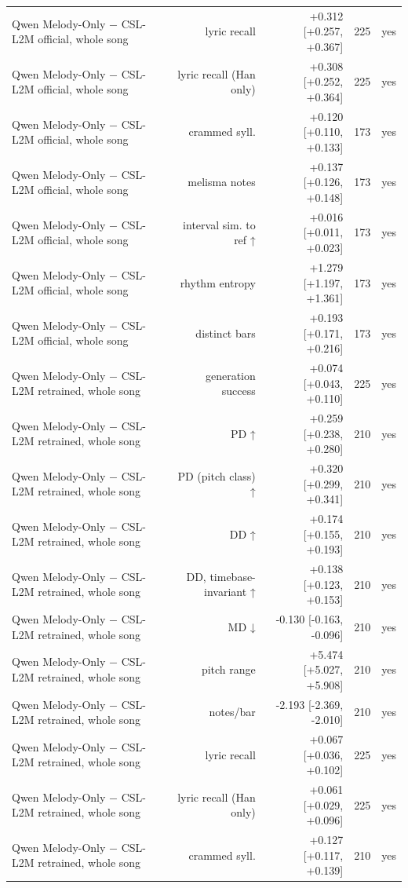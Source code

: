 \begin{table}[t]
\begin{tabular}{lrrrr}
Qwen Melody-Only $-$ CSL-L2M official, whole song & lyric recall & +0.312 [+0.257, +0.367] & 225 & yes \\
Qwen Melody-Only $-$ CSL-L2M official, whole song & lyric recall (Han only) & +0.308 [+0.252, +0.364] & 225 & yes \\
Qwen Melody-Only $-$ CSL-L2M official, whole song & crammed syll. & +0.120 [+0.110, +0.133] & 173 & yes \\
Qwen Melody-Only $-$ CSL-L2M official, whole song & melisma notes & +0.137 [+0.126, +0.148] & 173 & yes \\
Qwen Melody-Only $-$ CSL-L2M official, whole song & interval sim. to ref ↑ & +0.016 [+0.011, +0.023] & 173 & yes \\
Qwen Melody-Only $-$ CSL-L2M official, whole song & rhythm entropy & +1.279 [+1.197, +1.361] & 173 & yes \\
Qwen Melody-Only $-$ CSL-L2M official, whole song & distinct bars & +0.193 [+0.171, +0.216] & 173 & yes \\
Qwen Melody-Only $-$ CSL-L2M retrained, whole song & generation success & +0.074 [+0.043, +0.110] & 225 & yes \\
Qwen Melody-Only $-$ CSL-L2M retrained, whole song & PD ↑ & +0.259 [+0.238, +0.280] & 210 & yes \\
Qwen Melody-Only $-$ CSL-L2M retrained, whole song & PD (pitch class) ↑ & +0.320 [+0.299, +0.341] & 210 & yes \\
Qwen Melody-Only $-$ CSL-L2M retrained, whole song & DD ↑ & +0.174 [+0.155, +0.193] & 210 & yes \\
Qwen Melody-Only $-$ CSL-L2M retrained, whole song & DD, timebase-invariant ↑ & +0.138 [+0.123, +0.153] & 210 & yes \\
Qwen Melody-Only $-$ CSL-L2M retrained, whole song & MD ↓ & -0.130 [-0.163, -0.096] & 210 & yes \\
Qwen Melody-Only $-$ CSL-L2M retrained, whole song & pitch range & +5.474 [+5.027, +5.908] & 210 & yes \\
Qwen Melody-Only $-$ CSL-L2M retrained, whole song & notes/bar & -2.193 [-2.369, -2.010] & 210 & yes \\
Qwen Melody-Only $-$ CSL-L2M retrained, whole song & lyric recall & +0.067 [+0.036, +0.102] & 225 & yes \\
Qwen Melody-Only $-$ CSL-L2M retrained, whole song & lyric recall (Han only) & +0.061 [+0.029, +0.096] & 225 & yes \\
Qwen Melody-Only $-$ CSL-L2M retrained, whole song & crammed syll. & +0.127 [+0.117, +0.139] & 210 & yes \\

\end{tabular}
\end{table}
